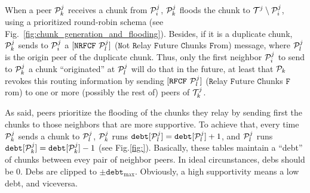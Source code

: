 \label{sec:chunk_flooding}
When a peer ${\cal P}^j_k$ receives a chunk from ${\cal P}^j_i$,
${\cal P}^j_k$ floods the chunk to ${\cal T}^j \setminus {\cal
P}^j_i$, using a prioritized round-robin schema (see
Fig.~\ref{fig:chunk_generation_and_flooding}). Besides, if it is a
duplicate chunk, ${\cal P}^j_k$ sends to ${\cal P}^j_i$ a
$[\mathtt{NRFCF}~{\cal P}^j_l]$ ($\mathtt{N}$ot $\mathtt{R}$elay
$\mathtt{F}$uture $\mathtt{C}$hunks $\mathtt{F}$rom) message, where
${\cal P}^j_l$ is the origin peer of the duplicate chunk. Thus, only
the first neighbor ${\cal P}^j_i$ to send to ${\cal P}^j_k$ a chunk
``originated'' at ${\cal P}^j_l$ will do that in the future, at least
that ${\cal P}_k$ revokes this routing information by sending
$[\mathtt{RFCF}~{\cal P}^j_l]$ ($\mathtt{R}$elay $\mathtt{F}$uture
$\mathtt{C}$hunks $\mathtt{F}$rom) to one or more (possibly the rest
of) peers of ${\cal T}^j_k$.

As said, peers prioritize the flooding of the chunks they relay by
sending first the chunks to those neighbors that are more
supportive. To achieve that, every time ${\cal P}^j_k$ sends a chunk
to ${\cal P}^j_l$, ${\cal P}^j_k$ runs $\mathtt{debt}[{\cal P}^j_l]
= \mathtt{debt}[{\cal P}^j_l]+1$, and ${\cal P}^j_l$ runs
$\mathtt{debt}[{\cal P}^j_k] =
\mathtt{debt}[{\cal P}^j_k]-1$ (see Fig.\ref{fig:}). Basically, these
tables maintain a ``debt'' of chunks between evey pair of neighbor
peers. In ideal circunstances, debs should be $0$. Debs are clipped to
$\pm\mathtt{debt}_{\text{max}}$. Obviously, a high supportivity means
a low debt, and viceversa.

\begin{comment}
In each round, peers check if a chunk have been received from the rest
of peers of the team (${\cal P}_k\in {\cal T}_j)$). If not, peers send
a $[\mathtt{propagate}~{\cal P}_i]$ to one or more (possibly
to the rest of) peers of the team, where ${\cal P}_i$ is the origin peer
of the missing chunk. At this point, the process continues as
described in Section~\ref{dbs:chunk_flooding}.
\end{comment}

\begin{comment}
For each ${\cal P}_k\in N({\cal P}_i)$, ${\cal P}_i$ checks if a chunk
has been received from ${\cal P}_k$. If ${\cal P}_i$ detects that
${\cal P}_k$ has not sent a chunk to it during $L$ consecutive rounds,
performs $N({\cal P}_i) = N({\cal P}_i)\setminus{\cal P}_k$, and stops
sending to ${\cal P}_k$ more chunks.
\end{comment}
\begin{comment}
computes a
``chunk-debt'', denoted by $d({\cal P}_k)$, that is incremented each
time a chunk is received from ${\cal P}_k$ and decremented each time a
chunk is sent to ${\cal P}_k$. If ${\cal P}_i$ verifies that $d({\cal
  P}_k)>D$ (the maximum debt), then ${\cal P}_i$ considers that ${\cal
  P}_k$ is unable to communicate with it, performs $N({\cal P}_i) =
N({\cal P}_i)\setminus{\cal P}_k$, and stops sending to ${\cal P}_k$
more chunks.
\end{comment}



